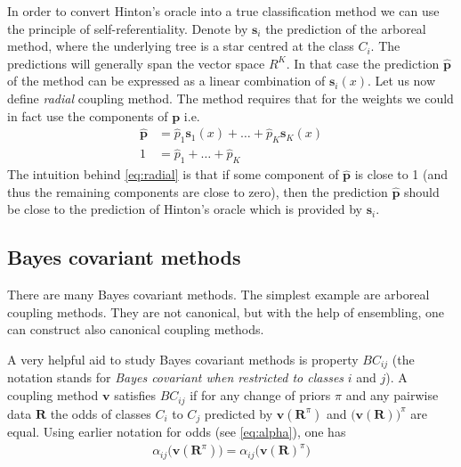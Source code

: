 In order to convert Hinton's oracle into a true classification method we can use the principle of self-referentiality.  Denote by $\boldsymbol{s}_i$ the prediction of the arboreal method, where the underlying tree is a star centred at the class $C_i$. The predictions will generally span the vector space $R^K$. In that case the prediction $\hat{\boldsymbol{p}}$ of the method  can be expressed as a linear combination of $\boldsymbol{s}_i(x)$. Let us now define \emph{radial} coupling method. The  method requires that for the  weights we could in fact use the components of $\boldsymbol{p}$ i.e.
\begin{equation}
	\begin{split}
	\hat {\boldsymbol{p}} &= \hat p_1 \boldsymbol{s}_1(x) + \ldots + \hat p_K \boldsymbol{s}_K(x)\\
	1 &= \hat p_1 + \ldots + \hat p_K
	\end{split}
	 \label{eq:radial}
\end{equation}
%
The intuition behind \eqref{eq:radial} is that if some component of $\hat{\boldsymbol{p}}$ is close to 1 (and thus the remaining components are close to zero), then the prediction $\hat{\boldsymbol{p}}$ should be close to the prediction of Hinton's oracle which is provided by ${\boldsymbol{s}}_i$.

\subsection{Bayes covariant methods} \label{sec:bc2}

There are many Bayes covariant methods. The simplest example are arboreal coupling methods. They are not canonical, but with the help of ensembling, one can construct also canonical coupling methods. 

A very helpful aid to study Bayes covariant methods is property $BC_{ij}$ (the notation stands for \emph{Bayes covariant when restricted to classes} $i$ and $j$). A coupling method $\boldsymbol{v}$ satisfies $BC_{ij}$ if for any change of priors $\pi$ and any  pairwise data $\boldsymbol{R}$ the odds of classes $C_i$ to $C_j$ predicted by $\boldsymbol{v}(\boldsymbol{R}^\pi)$ and $\bigl(\boldsymbol{v}(\boldsymbol{R})\bigr)^\pi$ are equal. Using earlier notation for odds (see \eqref{eq:alpha}), one has
\begin{align}
	\alpha_{ij} \bigl(\boldsymbol{v}(\boldsymbol{R}^\pi) \bigr) = \alpha_{ij} \bigl(\boldsymbol{v}(\boldsymbol{R})^\pi \bigr)
\end{align}

